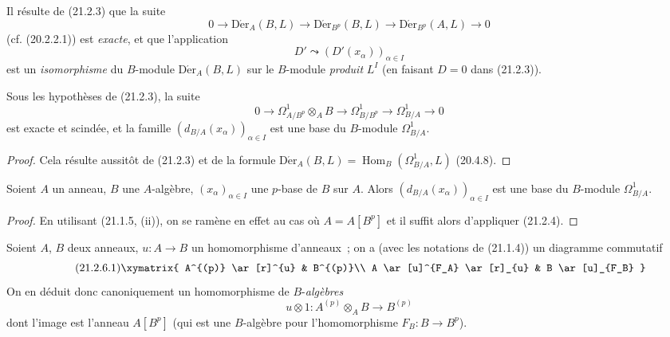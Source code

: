 Il résulte de (21.2.3) que la suite
\begin{equation}
\tag{21.2.3.1}
\label{0.21.2.3.1-fr}
0\to\operatorname{D\acute{e}r}_A(B,L)\to\operatorname{D\acute{e}r}_{B^p}(B,L)
\to\operatorname{D\acute{e}r}_{B^p}(A,L)\to0
\end{equation}
(cf. (20.2.2.1)) est \emph{exacte}, et que l'application
\begin{equation}
\tag{21.2.3.2}
\label{0.21.2.3.2-fr}
D'\leadsto(D'(x_\alpha))_{\alpha\in I}
\end{equation}
est un \emph{isomorphisme} du $B$-module $\operatorname{D\acute{e}r}_A(B,L)$ sur le
$B$-module \emph{produit} $L^I$ (en faisant $D=0$ dans (21.2.3)).

\begin{corollary}[21.2.4]
\label{0.21.2.4-fr}
Sous les hypothèses de \textup{(21.2.3)}, la suite
\begin{equation}
\tag{21.2.4.1}
\label{0.21.2.4.1-fr}
0\to\Omega^1_{A/B^p}\otimes_A B\to\Omega^1_{B/B^p}
\to\Omega^1_{B/A}\to0
\end{equation}
est exacte et scindée, et la famille $(d_{B/A}(x_\alpha))_{\alpha\in I}$ est
une base du $B$-module $\Omega^1_{B/A}$.
\end{corollary}

\begin{proof}
Cela résulte aussitôt de (21.2.3) et de la formule
$\operatorname{D\acute{e}r}_A(B,L)=\operatorname{Hom}_B(\Omega^1_{B/A},L)$ (20.4.8).
\end{proof}

\begin{corollary}[21.2.5]
\label{0.21.2.5-fr}
Soient $A$ un anneau, $B$ une $A$-algèbre, $(x_\alpha)_{\alpha\in I}$ une
$p$-base de $B$ sur $A$. Alors $(d_{B/A}(x_\alpha))_{\alpha\in I}$ est une
base du $B$-module $\Omega^1_{B/A}$.
\end{corollary}

\begin{proof}
En utilisant (21.1.5, (ii)), on se ramène en effet au cas où $A=A[B^p]$ et il suffit
alors d'appliquer (21.2.4).
\end{proof}

\begin{env}[21.2.6]
\label{0.21.2.6-fr}
Soient $A$, $B$ deux anneaux, $u:A\to B$ un homomorphisme d'anneaux~; on a
(avec les notations de (21.1.4)) un diagramme commutatif
\begin{equation}
\tag{21.2.6.1}
\label{0.21.2.6.1-fr}
\xymatrix{
 A^{(p)} \ar[r]^{u} & B^{(p)}\\
 A \ar[u]^{F_A} \ar[r]_{u} & B \ar[u]_{F_B}
}
\end{equation}
On en déduit donc canoniquement un homomorphisme de $B$-\emph{algèbres}
\begin{equation}
\tag{21.2.6.2}
\label{0.21.2.6.2-fr}
u\otimes1:A^{(p)}\otimes_A B\longrightarrow B^{(p)}
\end{equation}
dont l'image est l'anneau $A[B^p]$ (qui est une $B$-algèbre pour
l'homomorphisme $F_B:B\to B^p$).
\end{env}

